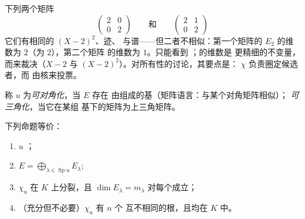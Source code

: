 \begin{example}\label{ex:b2:reduction:samechi}
下列两个矩阵
\[
\begin{pmatrix}2 & 0\\ 0 & 2\end{pmatrix}
\qquad\text{和}\qquad
\begin{pmatrix}2 & 1\\ 0 & 2\end{pmatrix}
\]
它们有相同的 $(X - 2)^2$、迹、
与谱——但二者不相似：第一个矩阵的
$E_2$ 的维数为 $2$（为 $2$），第二个矩阵
的维数为 $1$。只能看到
；的维数是
更精细的不变量，而来裁决（$X - 2$
与 $(X - 2)^2$）。对所有性的讨论，其要点是：
$\chi$ 负责圈定候选者，而
由核来投票。
\end{example}

\begin{definition}\label{def:b2:reduction:diag}
称 $u$ 为\emph{可对角化}，当 $E$ 存在
由组成的基（矩阵语言：与某个对角矩阵相似）；
\emph{可三角化}，当它在某组
基下的矩阵为上三角矩阵。
\end{definition}

\begin{theorem}[可对角化的判别准则]\label{thm:b2:reduction:diagcrit}
下列命题等价：
\begin{enumerate}
  \item $u$ ；
  \item $E = \bigoplus_{\lambda \in \operatorname{Sp} u} E_\lambda$;
  \item $\chi_u$ 在 $K$ 上分裂，且 $\dim E_\lambda = m_\lambda$
        对每个成立；
  \item （充分但不必要）$\chi_u$ 有 $n$ 个
        互不相同的根，且均在 $K$ 中。
\end{enumerate}
\end{theorem}


